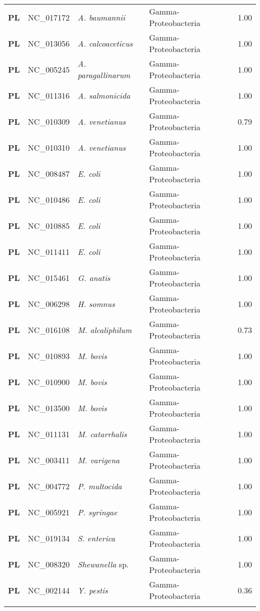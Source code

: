 \begin{adjustwidth}{-3cm}{2cm}
{\begin{supertabular}{>{\bfseries}l|p{0.1\textwidth}p{0.14\textwidth}l|l}
PL & NC\_017172 & \textit{A. baumannii} & Gamma-Proteobacteria & 1.00\\
PL & NC\_013056 & \textit{A. calcoaceticus} & Gamma-Proteobacteria & 1.00\\
PL & NC\_005245 & \textit{A. paragallinarum} & Gamma-Proteobacteria & 1.00\\
PL & NC\_011316 & \textit{A. salmonicida} & Gamma-Proteobacteria & 1.00\\
PL & NC\_010309 & \textit{A. venetianus} & Gamma-Proteobacteria & 0.79\\
PL & NC\_010310 & \textit{A. venetianus} & Gamma-Proteobacteria & 1.00\\
PL & NC\_008487 & \textit{E. coli} & Gamma-Proteobacteria & 1.00\\
PL & NC\_010486 & \textit{E. coli} & Gamma-Proteobacteria & 1.00\\
PL & NC\_010885 & \textit{E. coli} & Gamma-Proteobacteria & 1.00\\
PL & NC\_011411 & \textit{E. coli} & Gamma-Proteobacteria & 1.00\\
PL & NC\_015461 & \textit{G. anatis} & Gamma-Proteobacteria & 1.00\\
PL & NC\_006298 & \textit{H. somnus} & Gamma-Proteobacteria & 1.00\\
PL & NC\_016108 & \textit{M. alcaliphilum} & Gamma-Proteobacteria & 0.73\\
PL & NC\_010893 & \textit{M. bovis} & Gamma-Proteobacteria & 1.00\\
PL & NC\_010900 & \textit{M. bovis} & Gamma-Proteobacteria & 1.00\\
PL & NC\_013500 & \textit{M. bovis} & Gamma-Proteobacteria & 1.00\\
PL & NC\_011131 & \textit{M. catarrhalis} & Gamma-Proteobacteria & 1.00\\
PL & NC\_003411 & \textit{M. varigena} & Gamma-Proteobacteria & 1.00\\
PL & NC\_004772 & \textit{P. multocida} & Gamma-Proteobacteria & 1.00\\
PL & NC\_005921 & \textit{P. syringae} & Gamma-Proteobacteria & 1.00\\
PL & NC\_019134 & \textit{S. enterica} & Gamma-Proteobacteria & 1.00\\
PL & NC\_008320 & \textit{Shewanella} sp. & Gamma-Proteobacteria & 1.00\\
PL & NC\_002144 & \textit{Y. pestis} & Gamma-Proteobacteria & 0.36\\
\\

\end{supertabular}}
\end{adjustwidth}
